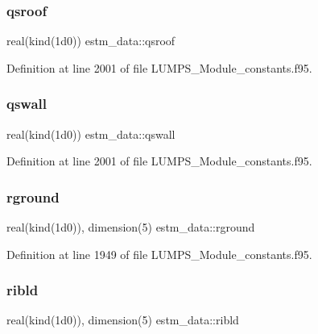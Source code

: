 \mbox{\label{namespaceestm__data_aa18b673d46a2acdcdbb40997a3ddab0b}} 
\subsubsection{\texorpdfstring{qsroof}{qsroof}}
{\footnotesize\ttfamily real(kind(1d0)) estm\+\_\+data\+::qsroof}



Definition at line 2001 of file L\+U\+M\+P\+S\+\_\+\+Module\+\_\+constants.\+f95.

\mbox{\label{namespaceestm__data_aafce9cf85961d2bdc97dcd69019884d6}} 
\subsubsection{\texorpdfstring{qswall}{qswall}}
{\footnotesize\ttfamily real(kind(1d0)) estm\+\_\+data\+::qswall}



Definition at line 2001 of file L\+U\+M\+P\+S\+\_\+\+Module\+\_\+constants.\+f95.

\mbox{\label{namespaceestm__data_ae940330d6806444c16f7c8a9195800cf}} 
\subsubsection{\texorpdfstring{rground}{rground}}
{\footnotesize\ttfamily real(kind(1d0)), dimension(5) estm\+\_\+data\+::rground}



Definition at line 1949 of file L\+U\+M\+P\+S\+\_\+\+Module\+\_\+constants.\+f95.

\mbox{\label{namespaceestm__data_aeec5613d21243119700929bc31e4bef4}} 
\subsubsection{\texorpdfstring{ribld}{ribld}}
{\footnotesize\ttfamily real(kind(1d0)), dimension(5) estm\+\_\+data\+::ribld}



